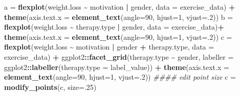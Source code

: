 \documentclass[
  man]{apa6}
\newenvironment{Shaded}{\begin{snugshade}}{\end{snugshade}}
\newcommand{\CommentTok}[1]{\textcolor[rgb]{0.56,0.35,0.01}{\textit{#1}}}
\newcommand{\DataTypeTok}[1]{\textcolor[rgb]{0.13,0.29,0.53}{#1}}
\newcommand{\DecValTok}[1]{\textcolor[rgb]{0.00,0.00,0.81}{#1}}
\newcommand{\KeywordTok}[1]{\textcolor[rgb]{0.13,0.29,0.53}{\textbf{#1}}}
\newcommand{\NormalTok}[1]{#1}
\newcommand{\OperatorTok}[1]{\textcolor[rgb]{0.81,0.36,0.00}{\textbf{#1}}}
\newcommand{\StringTok}[1]{\textcolor[rgb]{0.31,0.60,0.02}{#1}}
\begin{document}
\begin{Shaded}
\begin{Highlighting}[]
\NormalTok{a =}\StringTok{ }\KeywordTok{flexplot}\NormalTok{(weight.loss }\OperatorTok{\textasciitilde{}}\StringTok{ }\NormalTok{motivation }\OperatorTok{|}\StringTok{ }\NormalTok{gender, }
             \DataTypeTok{data =}\NormalTok{ exercise\_data) }\OperatorTok{+}
\StringTok{              }\KeywordTok{theme}\NormalTok{(}\DataTypeTok{axis.text.x =} \KeywordTok{element\_text}\NormalTok{(}\DataTypeTok{angle=}\DecValTok{90}\NormalTok{, }\DataTypeTok{hjust=}\DecValTok{1}\NormalTok{, }\DataTypeTok{vjust=}\NormalTok{.}\DecValTok{2}\NormalTok{))}
\NormalTok{b =}\StringTok{ }\KeywordTok{flexplot}\NormalTok{(weight.loss }\OperatorTok{\textasciitilde{}}\StringTok{ }\NormalTok{therapy.type }\OperatorTok{|}\StringTok{ }\NormalTok{gender, }
             \DataTypeTok{data =}\NormalTok{ exercise\_data)}\OperatorTok{+}
\StringTok{              }\KeywordTok{theme}\NormalTok{(}\DataTypeTok{axis.text.x =} \KeywordTok{element\_text}\NormalTok{(}\DataTypeTok{angle=}\DecValTok{90}\NormalTok{, }\DataTypeTok{hjust=}\DecValTok{1}\NormalTok{, }\DataTypeTok{vjust=}\NormalTok{.}\DecValTok{2}\NormalTok{))}
\NormalTok{c =}\StringTok{ }\KeywordTok{flexplot}\NormalTok{(weight.loss }\OperatorTok{\textasciitilde{}}\StringTok{ }\NormalTok{motivation }\OperatorTok{|}\StringTok{  }\NormalTok{gender }\OperatorTok{+}\StringTok{ }\NormalTok{therapy.type, }
             \DataTypeTok{data =}\NormalTok{ exercise\_data) }\OperatorTok{+}
\StringTok{      }\NormalTok{ggplot2}\OperatorTok{::}\KeywordTok{facet\_grid}\NormalTok{(therapy.type }\OperatorTok{\textasciitilde{}}\StringTok{ }\NormalTok{gender, }
              \DataTypeTok{labeller =}\NormalTok{ ggplot2}\OperatorTok{::}\KeywordTok{labeller}\NormalTok{(}\DataTypeTok{therapy.type =}\NormalTok{ label\_value)) }\OperatorTok{+}
\StringTok{              }\KeywordTok{theme}\NormalTok{(}\DataTypeTok{axis.text.x =} \KeywordTok{element\_text}\NormalTok{(}\DataTypeTok{angle=}\DecValTok{90}\NormalTok{, }\DataTypeTok{hjust=}\DecValTok{1}\NormalTok{, }\DataTypeTok{vjust=}\NormalTok{.}\DecValTok{2}\NormalTok{))}
\CommentTok{\#\#\#\# edit point size}
\NormalTok{c =}\StringTok{ }\KeywordTok{modify\_points}\NormalTok{(c, }\DataTypeTok{size=}\NormalTok{.}\DecValTok{25}\NormalTok{)}
\end{Highlighting}
\end{Shaded}

\normalsize

\small
\end{document}

